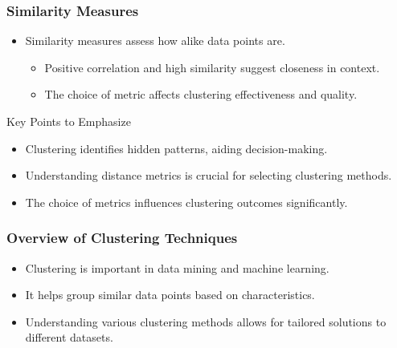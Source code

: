 \documentclass[aspectratio=169]{beamer}
\begin{document}
\begin{frame}[fragile]
    \frametitle{Similarity Measures}
    \begin{itemize}
        \item Similarity measures assess how alike data points are.
        \begin{itemize}
            \item Positive correlation and high similarity suggest closeness in context.
            \item The choice of metric affects clustering effectiveness and quality.
        \end{itemize}
    \end{itemize}

    \begin{block}{Key Points to Emphasize}
        \begin{itemize}
            \item Clustering identifies hidden patterns, aiding decision-making.
            \item Understanding distance metrics is crucial for selecting clustering methods.
            \item The choice of metrics influences clustering outcomes significantly.
        \end{itemize}
    \end{block}
\end{frame}

\begin{frame}[fragile]
    \frametitle{Overview of Clustering Techniques}
    \begin{itemize}
        \item Clustering is important in data mining and machine learning.
        \item It helps group similar data points based on characteristics.
        \item Understanding various clustering methods allows for tailored solutions to different datasets.
    \end{itemize}
\end{frame}
\end{document}
